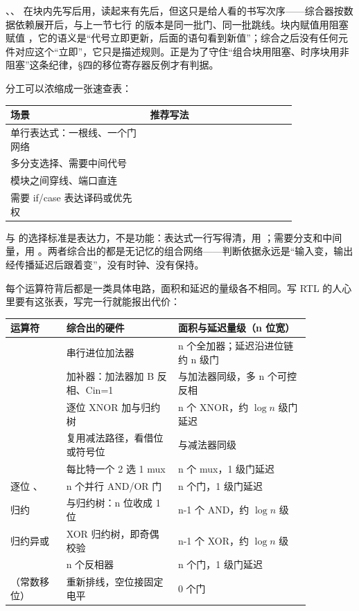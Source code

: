 、、 在块内先写后用，读起来有先后，但这只是给人看的书写次序——综合器按数据依赖展开后，与上一节七行  的版本是同一批门、同一批跳线。块内赋值用阻塞赋值 \code{=}，它的语义是“代号立即更新，后面的语句看到新值”；综合之后没有任何元件对应这个“立即”，它只是描述规则。正是为了守住“组合块用阻塞、时序块用非阻塞”这条纪律，§四的移位寄存器反例才有判据。

分工可以浓缩成一张速查表：

\begin{longtable}{L{0.4\linewidth}L{0.42\linewidth}}
\toprule
场景 & 推荐写法 \\
\midrule
单行表达式：一根线、一个门网络 &  \\
多分支选择、需要中间代号 &  \\
模块之间穿线、端口直连 &  \\
需要 if/case 表达译码或优先权 &  \\
\bottomrule
\end{longtable}

\begin{keyidea}
 与  的选择标准是表达力，不是功能：表达式一行写得清，用 ；需要分支和中间量，用 。两者综合出的都是无记忆的组合网络——判断依据永远是“输入变，输出经传播延迟后跟着变”，没有时钟、没有保持。
\end{keyidea}

每个运算符背后都是一类具体电路，面积和延迟的量级各不相同。写 RTL 的人心里要有这张表，写完一行就能报出代价：

\begin{longtable}{L{0.16\linewidth}L{0.32\linewidth}L{0.38\linewidth}}
\toprule
运算符 & 综合出的硬件 & 面积与延迟量级（n 位宽） \\
\midrule
{} & 串行进位加法器 & n 个全加器；延迟沿进位链约 n 级门 \\
 & 加补器：加法器加 B 反相、Cin=1 & 与加法器同级，多 n 个可控反相 \\
 & 逐位 XNOR 加与归约树 & n 个 XNOR，约 $\log n$ 级门延迟 \\
 & 复用减法路径，看借位或符号位 & 与减法器同级 \\
 & 每比特一个 2 选 1 mux & n 个 mux，1 级门延迟 \\
逐位 \code{\&}、\code{|} & n 个并行 AND/OR 门 & n 个门，1 级门延迟 \\
归约  & 与归约树：n 位收成 1 位 & n-1 个 AND，约 $\log n$ 级 \\
归约异或 & XOR 归约树，即奇偶校验 & n-1 个 XOR，约 $\log n$ 级 \\
 & n 个反相器 & n 个门，1 级门延迟 \\
（常数移位） & 重新排线，空位接固定电平 & 0 个门 \\
\bottomrule
\end{longtable}

